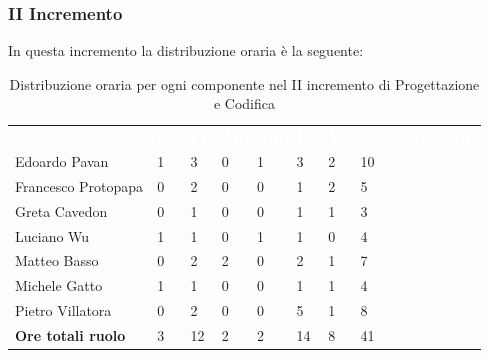\subsubsection{II Incremento}
In questa incremento la distribuzione oraria è la seguente:
\begin{table}[H]
\begin{center}
\renewcommand{\arraystretch}{1.25}
\begin{tabular}{ m{}<{\centering}  m{}<{\centering} m{}<{\centering} m{}<{\centering}  m{}<{\centering}  m{}<{\centering}  m{}<{\centering}  m{}<{\centering}   }
	\rowcolor{darkblue}
	\textcolor{white}{\textbf{Componente}} &\textcolor{white}{\textbf{Re}}&\textcolor{white}{\textbf{Pt}}&\textcolor{white}{\textbf{An}}&\textcolor{white}{\textbf{Am}}&\textcolor{white}{\textbf{Pr}}&\textcolor{white}{\textbf{Ve}}&\textcolor{white}{\textbf{Ore complessive}}\\ 
	Edoardo Pavan & 1 & 3 & 0 & 1 & 3 & 2 & 10 \\	
	
	Francesco Protopapa & 0 & 2 & 0 & 0 & 1 & 2 & 5 \\

	Greta Cavedon & 0 & 1 & 0 & 0 & 1 & 1 & 3 \\
	
	Luciano Wu & 1 & 1 & 0 & 1 & 1 & 0 & 4 \\
	
	Matteo Basso & 0 & 2 & 2 & 0 & 2 & 1 & 7 \\
	
	Michele Gatto & 1 & 1 & 0 & 0 & 1 & 1 & 4 \\
	
	Pietro Villatora & 0 & 2 & 0 & 0 & 5 & 1 & 8 \\
	
	\textbf{Ore totali ruolo} & 3 & 12 & 2 & 2 & 14 & 8 & 41 \\

\end{tabular}
\caption{Distribuzione oraria per ogni componente nel II incremento di Progettazione e Codifica}
\end{center}
\end{table}

